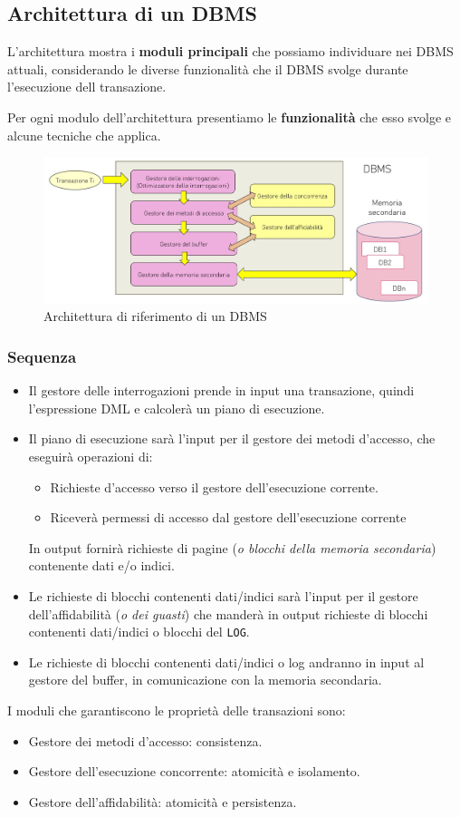 \documentclass[oneside,a4paper,11pt]{book}
\theoremstyle{italicstyle}
\theoremstyle{normStyle}
\begin{document}
\subsection{Architettura di un DBMS}
L'architettura mostra i \textbf{moduli principali} che possiamo individuare nei DBMS attuali,
considerando le diverse funzionalità che il DBMS svolge durante l'esecuzione dell 
transazione.

Per ogni modulo dell'architettura presentiamo le \textbf{funzionalità} 
che esso svolge e alcune tecniche che applica.
\begin{figure}[H]
    \centering
    \includegraphics[width=15cm]{img/gestoriDBMS.jpeg}
    \caption{Architettura di riferimento di un DBMS}
    \label{fig:arhc_DBMS}
  \end{figure}
\subsubsection{Sequenza}
\begin{itemize}
    \item Il gestore delle interrogazioni prende in input una transazione, quindi 
    l'espressione DML e calcolerà un piano di esecuzione.
    \item Il piano di esecuzione sarà l'input per il gestore dei metodi 
    d'accesso, che eseguirà operazioni di:
    \begin{itemize}
        \item Richieste d'accesso verso il 
        gestore dell'esecuzione corrente.
        \item Riceverà permessi di accesso dal gestore dell'esecuzione 
        corrente
    \end{itemize}
    In output fornirà richieste di pagine (\textit{o blocchi della memoria 
    secondaria}) contenente dati e/o indici.
    \item  Le richieste di blocchi contenenti dati/indici sarà 
    l'input per il gestore dell'affidabilità (\textit{o dei guasti}) che manderà
    in output richieste di blocchi contenenti dati/indici o blocchi del \verb|LOG|.
    \item Le richieste di blocchi contenenti dati/indici o log andranno in 
    input al gestore del buffer, in comunicazione con la memoria secondaria.
\end{itemize}
I moduli che garantiscono le proprietà delle transazioni sono:
\begin{itemize}
    \item Gestore dei metodi d'accesso: consistenza.
    \item Gestore dell'esecuzione concorrente: atomicità e isolamento.
    \item Gestore dell'affidabilità: atomicità e persistenza. 
\end{itemize}
\end{document}
